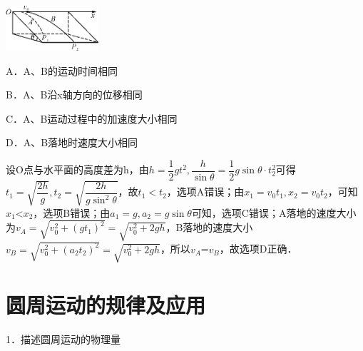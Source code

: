 \documentclass[cn,10.5pt,chinese,mac,chinesefont=founder]{elegantbook}
\begin{document}
\begin{center}\includegraphics[width=1.35417in,height=0.65625in]{media/image170.png}\end{center}

A．A、B的运动时间相同

B．A、B沿x轴方向的位移相同

C．A、B运动过程中的加速度大小相同

D．A、B落地时速度大小相同
\begin{solution}
	设O点与水平面的高度差为h，由$h=\dfrac{1}{2} g t^{2}, \dfrac{h}{\sin \theta}=\dfrac{1}{2} g \sin \theta \cdot t_{2}^{2}$可得$t_{1}=\sqrt{\dfrac{2 h}{g}}, t_{2}=\sqrt{\dfrac{2 h}{g \sin ^{2} \theta}}$，故$t_1< t_2$，选项A错误；由$x_{1}=v_{0} t_{1}, x_{2}=v_{0} t_{2}$，可知$x_1$\textless $x_2$，选项B错误；由$a_{1}=g, a_{2}=g \sin \theta$可知，选项C错误；A落地的速度大小为$v_{A}=\sqrt{v_{0}^{2}+\left(g t_{1}\right)^{2}}=\sqrt{v_{0}^{2}+2 g h}$，B落地的速度大小$v_{B}=\sqrt{v_{0}^{2}+\left(a_{2} t_{2}\right)^{2}}=\sqrt{v_{0}^{2}+2 g h}$，所以$v_A$=$v_B$，故选项D正确．
\end{solution}

\newpage
\section{圆周运动的规律及应用}


1．描述圆周运动的物理量
\end{document}
